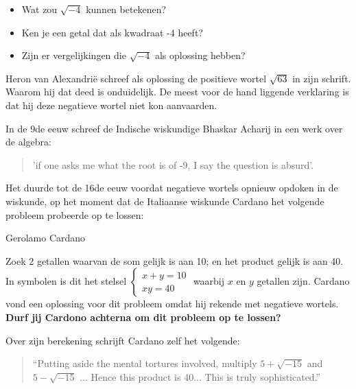 \documentclass{ximera}
\begin{document}
\begin{denkvraag*}{}
\begin{itemize}
    \item Wat zou \(\sqrt{-4}\) kunnen betekenen? 
    \item Ken je een getal dat als kwadraat -4 heeft? 
    \item Zijn er vergelijkingen die \(\sqrt{-4}\) als oplossing hebben? 
\end{itemize}
\end{denkvraag*}

Heron van Alexandrië schreef als oplossing de positieve wortel \(\sqrt{63}\) in zijn schrift. 
Waarom hij dat deed is onduidelijk.
De meest voor de hand liggende verklaring is dat hij deze negatieve wortel niet kon aanvaarden. 

In de 9de eeuw schreef de Indische wiskundige Bhaskar Acharij in een werk over de algebra: 

\begin{quote}
    'if one asks me what the root is of -9, I say the question is absurd'. 
\end{quote}
 

Het duurde tot de 16de eeuw voordat negatieve wortels opnieuw opdoken in de wiskunde, op het moment dat de Italiaanse wiskunde Cardano het volgende probleem probeerde op te lossen: 


\begin{exercise}{Gerolamo Cardano}

    Zoek 2 getallen waarvan de som gelijk is aan 10; en het product gelijk is aan 40.
    In symbolen is dit het stelsel \( 
        \begin{cases}
            x + y = 10 \\
            xy = 40
        \end{cases} \)
    waarbij \(x\) en \(y\) getallen zijn. \newline
    Cardano vond een oplossing voor dit probleem omdat hij rekende met negatieve wortels. \newline
    \textbf{Durf jij Cardono achterna om dit probleem op te lossen?}
\end{exercise}


Over zijn berekening schrijft Cardano zelf het volgende: 

\begin{quote}
    “Putting aside the mental tortures involved, 
    multiply \(5 + \sqrt{-15}\) and \(5 - \sqrt{-15}\) ... 
    Hence this product is 40... 
    This is truly sophisticated.”
\end{quote}
\end{document}
